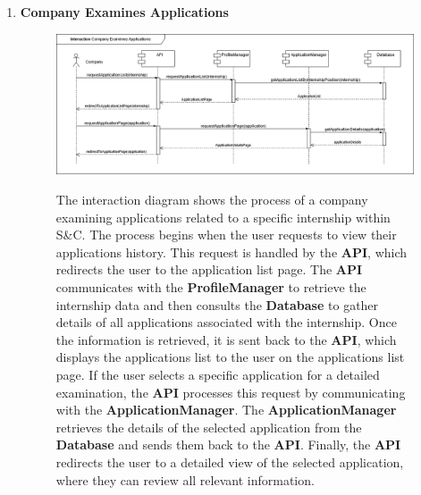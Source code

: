 \begin{enumerate}
    \newpage
    \item \textbf{Company Examines Applications}
    \begin{figure}[h!]
            \centering  \includegraphics[width=1\textwidth]{DD/Images/Interactions/INT13_CompanyExaminesApplications.drawio.png}
            \label{fig:ComponentViewDiagram}
            \caption*{The interaction diagram shows the process of a company examining applications related to a specific internship within S\&C. The process begins when the user requests to view their applications history. This request is handled by the \textbf{API}, which redirects the user to the application list page. The \textbf{API} communicates with the \textbf{ProfileManager} to retrieve the internship data and then consults the \textbf{Database} to gather details of all applications associated with the internship. 
            Once the information is retrieved, it is sent back to the \textbf{API}, which displays the applications list to the user on the applications list page.
            If the user selects a specific application for a detailed examination, the \textbf{API} processes this request by communicating with the \textbf{ApplicationManager}. The \textbf{ApplicationManager} retrieves the details of the selected application from the \textbf{Database} and sends them back to the \textbf{API}. Finally, the \textbf{API} redirects the user to a detailed view of the selected application, where they can review all relevant information.
            }
    \end{figure}


\end{enumerate}

